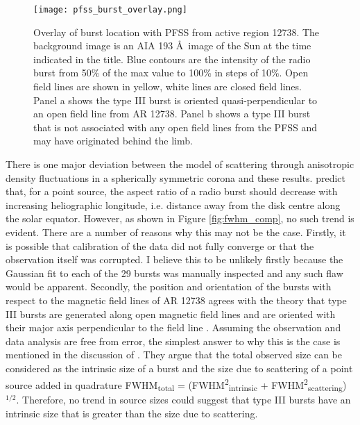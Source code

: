 \begin{figure}
\centering
\texttt{[image: pfss\_burst\_overlay.png]}
\caption[Overlay of burst location with PFSS from active region 12738.]{Overlay of burst location with PFSS from active region 12738. The background image is an AIA 193 \AA \ image of the Sun at the time indicated in the title. Blue contours are the intensity of the radio burst from 50\% of the max value to 100\% in steps of 10\%. Open field lines are shown in yellow, white lines are closed field lines. Panel a shows the type III burst is oriented quasi-perpendicular to an open field line from AR 12738. Panel b shows a type III burst that is not associated with any open field lines from the PFSS and may have originated behind the limb.}
\label{fig:pfss_overlay}
\end{figure}

There is one major deviation between the model of scattering through anisotropic density fluctuations in a spherically symmetric corona and these results. \cite{Kontar2019} predict that, for a point source, the aspect ratio of a radio burst should decrease with increasing heliographic longitude, i.e. distance away from the disk centre along the solar equator. However, as shown in Figure \ref{fig:fwhm_comp}, no such trend is evident.  
There are a number of reasons why this may not be the case. Firstly, it is possible that calibration of the data did not fully converge or that the observation itself was corrupted. I believe this to be unlikely firstly because the Gaussian fit to each of the 29 bursts was manually inspected and any such flaw would be apparent. Secondly, the position and orientation of the bursts with respect to the magnetic field lines of AR 12738 agrees with the theory that type III bursts are generated along open magnetic field lines \citep{Wild1950a, Wild1950d} and are oriented with their major axis perpendicular to the field line \citep{Anantharamaiah1994}. 
Assuming the observation and data analysis are free from error, the simplest answer to why this is the case is mentioned in the discussion of \cite{Kontar2019}. They argue that the total observed size can be considered as the intrinsic size of a burst and the size due to scattering of a point source added in quadrature FWHM\textsubscript{total} = (FWHM\textsuperscript{2}\textsubscript{intrinsic} + FWHM\textsuperscript{2}\textsubscript{scattering})$^{1/2}$. Therefore, no trend in source sizes could suggest that type III bursts have an intrinsic size that is greater than the size due to scattering. 

